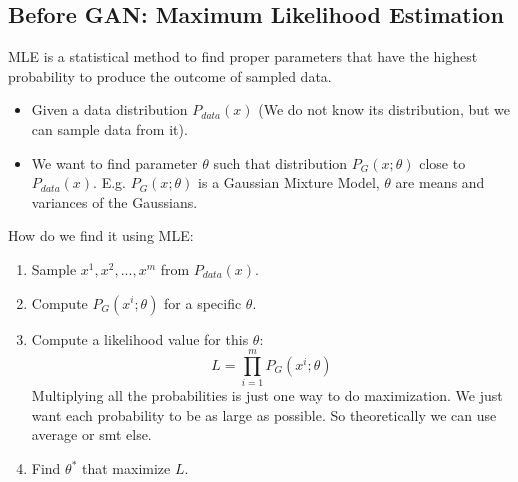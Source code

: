 \documentclass{../templates/ainote}
\begin{document}
\subsection{Before GAN: Maximum Likelihood Estimation}
MLE is a statistical method to find proper parameters that have the highest probability to produce the outcome of sampled data.
\begin{itemize}
    \item Given a data distribution $P_{data}(x)$ (We do not know its distribution, but we can sample data from it). 
    \item We want to find parameter $\theta$ such that distribution $P_G(x;\theta)$ close to $P_{data}(x)$. E.g. $P_G(x;\theta)$ is a Gaussian Mixture Model, $\theta$ are means and variances of the Gaussians. 
\end{itemize}
How do we find it using MLE:
\begin{enumerate}[1.]
    \item Sample ${x^1, x^2, ..., x^m}$ from $P_{data}(x)$.
    \item Compute $P_G(x^i;\theta)$ for a specific $\theta$.
    \item Compute a likelihood value for this $\theta$: 
        \begin{equation}
        \label{equ:llhood}
            L=\prod_{i=1}^{m}P_G(x^i;\theta)
        \end{equation}
        Multiplying all the probabilities is just one way to do maximization. We just want each probability to be as large as possible. So theoretically we can use average or smt else. 
    \item Find $\theta^\ast$ that maximize $L$.
\end{enumerate}
\end{document}

